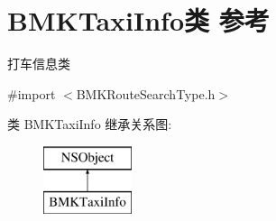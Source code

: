 \hypertarget{interface_b_m_k_taxi_info}{}\section{B\+M\+K\+Taxi\+Info类 参考}
\label{interface_b_m_k_taxi_info}


打车信息类  




{\ttfamily \#import $<$B\+M\+K\+Route\+Search\+Type.\+h$>$}

类 B\+M\+K\+Taxi\+Info 继承关系图\+:\begin{figure}[H]
\begin{center}
\leavevmode
\includegraphics[height=2.000000cm]{interface_b_m_k_taxi_info}
\end{center}
\end{figure}
